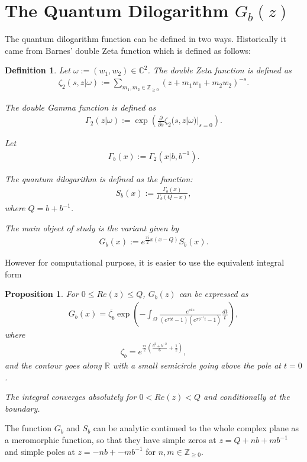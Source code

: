 \documentclass[10pt,reqno]{article}
\newtheorem{Prop}[Thm]{Proposition}
\newtheorem{Def}[Thm]{Definition}
\def\R{\mathbb{R}}
\def\C{\mathbb{C}}
\def\Z{\mathbb{Z}}
\def\G{\Gamma}
\def\W{\Omega}
\def\w{\omega}
\def\ze{\zeta}
\def\inv{^{-1}}
\def\over[#1]{\overline{#1}}
\newcommand{\Eq}[1]{\begin{align}#1\end{align}}
\numberwithin{equation}{section}
\begin{document}
\section{The Quantum Dilogarithm $G_b(z)$} \label{sec:qdilog}

The quantum dilogarithm function can be defined in two ways. Historically it came from Barnes' double Zeta function \cite{Ba} which is defined as follows:
\begin{Def}Let $\w:=(w_1,w_2)\in \C^2$. The double Zeta function is defined as
\Eq{\ze_2(s,z|\w):=\sum_{m_1,m_2\in\Z_{\geq0}}(z+m_1w_1+m_2w_2)^{-s}.}

The double Gamma function is defined as
\Eq{\G_2(z|\w):=\exp\left(\frac{\partial}{\partial
s}\ze_2(s,z|\w)|_{s=0}\right).}

Let
\Eq{\G_b(x):=\G_2(x|b,b\inv).}

The quantum dilogarithm is defined as the function:
\Eq{S_b(x):=\frac{\G_b(x)}{\G_b(Q-x)},}
where $Q=b+b\inv$.

The main object of study is the variant given by
\Eq{\label{GS}G_b(x):=e^{\frac{\pi i}{2}x(x-Q)}S_b(x).}
\end{Def}

However for computational purpose, it is easier to use the equivalent integral form
\begin{Prop} For $0\leq Re(z)\leq Q$, $G_b(z)$ can be expressed as
\Eq{\label{intform} G_b(x)=\over[\ze_b]\exp\left(-\int_{\W}\frac{e^{\pi tz}}{(e^{\pi bt}-1)(e^{\pi b\inv t}-1)}\frac{dt}{t}\right),}
where \Eq{\ze_b=e^{\frac{\pi i}{2}(\frac{b^2+b^{-2}}{6}+\frac{1}{2})},}
and the contour goes along $\R$ with a small semicircle going above the pole at $t=0$.

The integral converges absolutely for $0<Re(z)<Q$ and conditionally at the boundary.
\end{Prop}

The function $G_b$ and $S_b$ can be analytic continued to the whole complex plane as a meromorphic function, so that they have simple zeros at $z=Q+nb+mb\inv$ and simple poles at $z=-nb+-mb\inv$ for $n,m\in \Z_{\geq 0}$.
\end{document}
